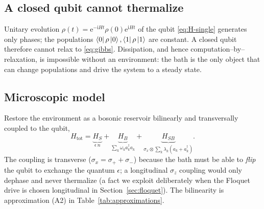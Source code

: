 \documentclass[11pt,a4paper]{article}
\theoremstyle{plain}
\theoremstyle{definition}
\theoremstyle{remark}
\newcommand{\ee}{\mathrm{e}}
\newcommand{\ii}{\mathrm{i}}
\begin{document}
\subsection{A closed qubit cannot thermalize}
Unitary evolution $\rho(t)=\ee^{-\ii Ht}\rho(0)\ee^{\ii Ht}$ of the qubit
\eqref{eq:H-single} generates only phases; the populations
$\bra{0}\rho\ket{0},\bra{1}\rho\ket{1}$ are constant. A closed qubit
therefore cannot relax to \eqref{eq:gibbs}. Dissipation, and hence
computation--by--relaxation, is impossible without an environment: the
bath is the only object that can change populations and drive the system
to a steady state.

\subsection{Microscopic model}
Restore the environment as a bosonic reservoir bilinearly and
transversally coupled to the qubit,
\begin{equation}
H_{\mathrm{tot}} = \underbrace{H_S}_{\epsilon\,n}
+ \underbrace{H_B}_{\sum_k\omega_k a_k^\dagger a_k}
+ \underbrace{H_{SB}}_{\sigma_x\otimes\sum_k\lambda_k(a_k+a_k^\dagger)} .
\label{eq:Htot-open}
\end{equation}
The coupling is transverse ($\sigma_x=\sigma_++\sigma_-$) because the bath
must be able to \emph{flip} the qubit to exchange the quantum $\epsilon$;
a longitudinal $\sigma_z$ coupling would only dephase and never thermalize
(a fact we exploit deliberately when the Floquet drive is chosen
longitudinal in Section~\ref{sec:floquet}). The bilinearity is
approximation (A2) in Table~\ref{tab:approximations}.
\end{document}
